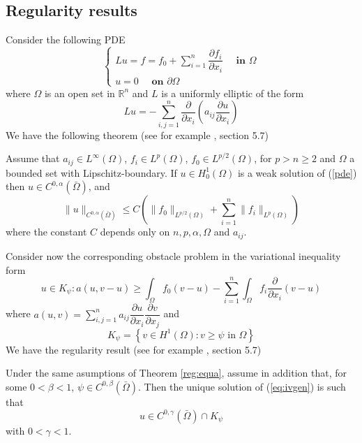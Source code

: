  \subsection*{Regularity results}
 Consider the following PDE
 \begin{equation}\label{pde}
 \begin{cases}
 Lu= f =f_0+\sum_{i=1}^n \dfrac{\partial f_i}{\partial x_i}\quad \textbf{ in } \Omega\\
 u=0 \quad \textbf{ on } \partial \Omega
 \end{cases}
 \end{equation}
where $\Omega$ is an open set in $\mathbb{R}^n$ and $L$ is a uniformly elliptic of the form
$$
Lu=-\sum_{i,j=1}^n \dfrac{\partial }{\partial x_i}\left(a_{ij}\dfrac{\partial u}{\partial x_i}\right)
$$
We have the following theorem  (see for example \cite{rodriguez}, section 5.7)
\begin{theorem}\label{reg:equa}
Assume that $a_{ij} \in L^\infty(\Omega)$, $f_i \in L^p(\Omega)$, $f_0 \in L^{p/2}(\Omega)$, for $p >n \geq 2$ and $\Omega$ a bounded set with Lipschitz-boundary. If $u \in H^1_0(\Omega)$ is a weak solution of (\ref{pde}) then $u \in C^{0,\alpha}(\bar\Omega)
$, and
$$
\|u\|_{ C^{0,\alpha}(\bar\Omega)}\leq C\left(\|f_0\|_{L^{p/2}(\Omega)}+\sum_{i=1}^n\|f_i\|_{L^p(\Omega)}\right)
$$
where the constant $C$ depends only on $n,p,\alpha,\Omega$ and $a_{ij}$.
\end{theorem}
Consider now the corresponding obstacle problem in the variational inequality form
\begin{equation} \label{eq:ivgen}
u\in K_\psi: a(u,v-u) \geq \int_{\Omega}f_0(v-u)-\sum_{i=1}^{n}\int_{\Omega}f_i\dfrac{\partial }{\partial x_i}(v-u)
\end{equation}
where $a(u,v)= \sum_{i,j=1}^n a_{ij}\dfrac{\partial u}{\partial x_i} \dfrac{\partial v}{\partial x_j}$ and
\begin{equation}
K_\psi= \left\{v \in H^1(\Omega): v \geq \psi \text{ in } \Omega \right\}
\end{equation}
We have the regularity result (see for example \cite{rodriguez}, section 5.7)
\begin{theorem}\label{reg:inequa}
Under the same asumptions of Theorem \ref{reg:equa}, assume in addition that, for some $0 < \beta <1$, $\psi \in C^{0,\beta}(\bar\Omega)$. Then the unique solution of (\ref{eq:ivgen}) is such that
$$
u \in  C^{0,\gamma}(\bar\Omega)\cap K_\psi
$$
with $0 < \gamma < 1$.
\end{theorem}

